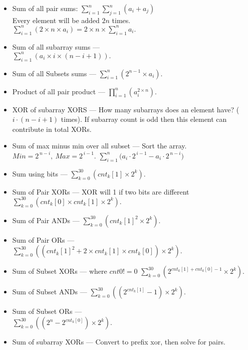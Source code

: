 \vspace{-5.5mm}
{\small
\begin{itemize}
\item Sum of all pair sums: $\sum_{i=1}^{n} \sum_{j=1}^{n} (a_i + a_j)$\\
Every element will be added $2n$ times.
$\sum_{i=1}^{n} (2 \times n \times a_{i}) = 2 \times n \times \sum_{i=1}^{n} a_{i}.$
\item Sum of all subarray sums — \\
$\sum_{i=1}^{n} \left(a_{i} \times i \times (n - i + 1)\right).$
\item Sum of all Subsets sums —
$\sum_{i=1}^{n} \left(2^{n-1} \times a_{i}\right).$
\item Product of all pair product —
$\prod_{i=1}^{n} \left(a_{i}^{2 \times n}\right).$
\item XOR of subarray XORS — How many subarrays does an element have? ($i \cdot (n - i + 1)$ times). If subarray count is odd then this element can contribute in total XORs.
\item Sum of max minus min over all subset — Sort the array. $Min = 2^{\,n-i}, \ Max = 2^{\,i-1}$. $\sum_{i=1}^{n} \big(a_i \cdot 2^{\,i-1} - a_i \cdot 2^{\,n-i}\big)$
\item Sum using bits —
$\sum_{k=0}^{30} \left(cnt_{k}[1] \times 2^{k}\right).$
\item Sum of Pair XORs — XOR will 1 if two bits
are different
$\sum_{k=0}^{30} \left(cnt_{k}[0] \times cnt_{k}[1] \times 2^{k}\right).$
\item Sum of Pair ANDs — 
$\sum_{k=0}^{30} \left(cnt_{k}[1]^2 \times 2^{k}\right).$
\item Sum of Pair ORs — \\
$\sum_{k=0}^{30} \left( \left( cnt_{k}[1]^{2} + 2 \times cnt_{k}[1] \times cnt_{k}[0] \right) \times 2^{k} \right).$
\item Sum of Subset XORs — where $cnt0 != 0$
$\sum_{k=0}^{30} \left(2^{cnt_{k}[1] + cnt_{k}[0] - 1} \times 2^{k}\right).$
\item Sum of Subset ANDs — 
$\sum_{k=0}^{30} \left( \left(2^{cnt_{k}[1]} - 1\right) \times 2^{k} \right).$
\item Sum of Subset ORs — \\
$\sum_{k=0}^{30} \left( \left(2^{n} - 2^{cnt_{k}[0]}\right) \times 2^{k} \right).$
\item Sum of subarray XORs — Convert to prefix xor, then solve for pairs.
\end{itemize}
}
